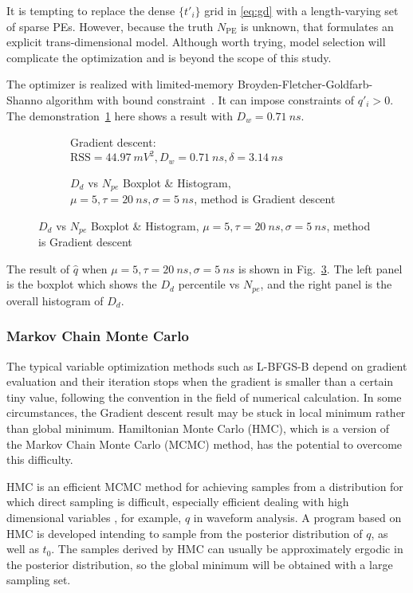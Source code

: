 It is tempting to replace the dense $\{t'_i\}$ grid in \eqref{eq:gd} with a length-varying set of sparse PEs. However, because the truth $N_\mathrm{PE}$ is unknown, that formulates an explicit trans-dimensional model.  Although worth trying, model selection will complicate the optimization and is beyond the scope of this study.

The optimizer is realized with limited-memory Broyden-Fletcher-Goldfarb-Shanno algorithm with bound constraint~\cite{byrd_limited_1995}.  It can impose constraints of $q'_i > 0$. The demonstration~\ref{fig:fitting} here shows a result with $D_w = \SI{0.71}{ns}$.

\begin{figure}[H]
  \begin{subfigure}{.5\textwidth}
    \centering
    \resizebox{\textwidth}{!}{}
    \caption{\label{fig:fitting}Gradient descent: $\mathrm{RSS}=\SI{44.97}{mV^2},D_w=\SI{0.71}{ns},\delta=\SI{3.14}{ns}$}
  \end{subfigure}
  \begin{subfigure}{.5\textwidth}
    \centering
    \resizebox{\textwidth}{!}{}
    \caption{\label{fig:fitting-npe} $D_d$ vs $N_{pe}$ Boxplot \& Histogram, $\mu=5, \tau=\SI{20}{ns}, \sigma=\SI{5}{ns}$, method is Gradient descent}
  \end{subfigure}
\end{figure}

The result of $\hat{q}$ when $\mu=5, \tau=\SI{20}{ns}, \sigma=\SI{5}{ns}$ is shown in Fig.~\ref{fig:fitting-npe}. The left panel is the boxplot which shows the $D_d$ percentile vs $N_{pe}$, and the right panel is the overall histogram of $D_d$. 

\subsubsection{Markov Chain Monte Carlo}

The typical variable optimization methods such as L-BFGS-B depend on gradient evaluation and their iteration stops when the gradient is smaller than a certain tiny value, following the convention in the field of numerical calculation. In some circumstances, the Gradient descent result may be stuck in local minimum rather than global minimum. Hamiltonian Monte Carlo (HMC), which is a version of the Markov Chain Monte Carlo (MCMC) method, has the potential to overcome this difficulty. 

HMC is an efficient MCMC method for achieving samples from a distribution for which direct sampling is difficult, especially efficient dealing with high dimensional variables \cite{neal_mcmc_2012}, for example, $q$ in waveform analysis. A program based on HMC is developed intending to sample from the posterior distribution of $q$, as well as $t_{0}$. The samples derived by HMC can usually be approximately ergodic in the posterior distribution, so the global minimum will be obtained with a large sampling set. 

